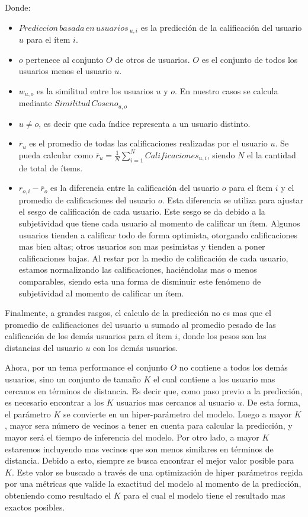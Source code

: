 \documentclass[11pt,a4paper,twoside]{thesis}
\begin{document}
\begin{description}
	\item[Donde:]
\end{description}
\begin{itemize}
	\item $Prediccion \mspace{3mu}basada \mspace{3mu}en \mspace{3mu}usuarios\mspace{3mu}_{u, i}$ es la predicción de la calificación del usuario $u$ para el ítem $i$.
	\item $o$ pertenece al conjunto $O$ de otros de usuarios. $O$ es el conjunto de todos los usuarios menos el usuario $u$.
	\item $w_{u,o}$ es la similitud entre los usuarios $u$ y $o$. En nuestro casos se calcula mediante $Similitud \mspace{3mu}Coseno_{u, o}$
	\item $u \neq o$, es decir que cada índice representa a un usuario distinto.
	\item $\overline{r}_{u}$ es el promedio de todas las calificaciones realizadas por el usuario $u$. Se pueda calcular como $\overline{r}_{u} = \frac{1}{N} \sum_{i=1}^N Calificaciones_{u,i}$, siendo $N$ el la cantidad de total de ítems.
	\item $r_{o,i} - \overline{r}_{o}$ es la diferencia entre la calificación del usuario $o$ para el ítem $i$ y el promedio de calificaciones del usuario $o$. Esta diferencia se utiliza para ajustar el sesgo de calificación de cada usuario. Este sesgo se da debido a la subjetividad que tiene cada usuario al momento de calificar un ítem. Algunos usuarios tienden a calificar todo de forma optimista, otorgando calificaciones mas bien altas; otros usuarios son mas pesimistas y tienden a poner calificaciones bajas. Al restar por la medio de calificación de cada usuario, estamos normalizando las calificaciones, haciéndolas mas o menos comparables, siendo esta una forma de disminuir este fenómeno de subjetividad al momento de calificar un ítem.
\end{itemize}

Finalmente, a grandes rasgos, el calculo de la predicción no es mas que el
promedio de calificaciones del usuario $u$ sumado al promedio pesado de las
calificación de los demás usuarios para el ítem $i$, donde los pesos son las
distancias del usuario $u$ con los demás usuarios.

Ahora, por un tema performance el conjunto $O$ no contiene a todos los demás
usuarios, sino un conjunto de tamaño $K$ el cual contiene a los usuario mas
cercanos en términos de distancia. Es decir que, como paso previo a la
predicción, es necesario encontrar a los $K$ usuarios mas cercanos al usuario
$u$. De esta forma, el parámetro $K$ se convierte en un hiper-parámetro del
modelo. Luego a mayor $K$, mayor sera número de vecinos a tener en cuenta para
calcular la predicción, y mayor será el tiempo de inferencia del modelo. Por
otro lado, a mayor $K$ estaremos incluyendo mas vecinos que son menos similares
en términos de distancia. Debido a esto, siempre se busca encontrar el mejor
valor posible para $K$. Este valor se buscado a través de una optimización de
hiper parámetros regida por una métricas que valide la exactitud del modelo al
momento de la predicción, obteniendo como resultado el $K$ para el cual el
modelo tiene el resultado mas exactos posibles.
\end{document}
